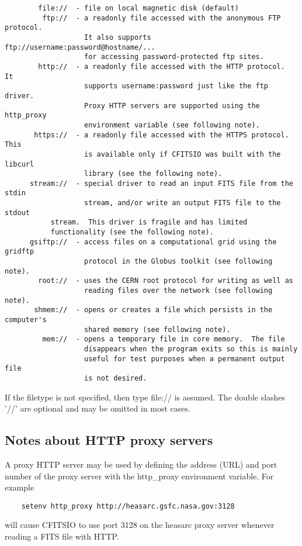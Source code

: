 \documentclass[11pt]{book}
\begin{document}
\begin{verbatim}
        file://  - file on local magnetic disk (default)
         ftp://  - a readonly file accessed with the anonymous FTP protocol.
                   It also supports  ftp://username:password@hostname/...
                   for accessing password-protected ftp sites.
        http://  - a readonly file accessed with the HTTP protocol.  It
                   supports username:password just like the ftp driver.
                   Proxy HTTP servers are supported using the http_proxy
                   environment variable (see following note).
       https://  - a readonly file accessed with the HTTPS protocol.  This
                   is available only if CFITSIO was built with the libcurl
                   library (see the following note).
      stream://  - special driver to read an input FITS file from the stdin
                   stream, and/or write an output FITS file to the stdout
		   stream.  This driver is fragile and has limited
		   functionality (see the following note).
      gsiftp://  - access files on a computational grid using the gridftp
                   protocol in the Globus toolkit (see following note).
        root://  - uses the CERN root protocol for writing as well as
                   reading files over the network (see following note).
       shmem://  - opens or creates a file which persists in the computer's
                   shared memory (see following note).
         mem://  - opens a temporary file in core memory.  The file
                   disappears when the program exits so this is mainly
                   useful for test purposes when a permanent output file
                   is not desired.
\end{verbatim}
If the filetype is not specified, then type file:// is assumed.
The double slashes '//' are optional and may be omitted in most cases.


\subsection{Notes about HTTP proxy servers}

A proxy HTTP server may be used by defining the address (URL) and port
number of the proxy server with the http\_proxy environment variable.
For example

\begin{verbatim}
    setenv http_proxy http://heasarc.gsfc.nasa.gov:3128
\end{verbatim}
will cause CFITSIO to use port 3128 on the heasarc proxy server whenever
reading a FITS file with HTTP.
\end{document}
